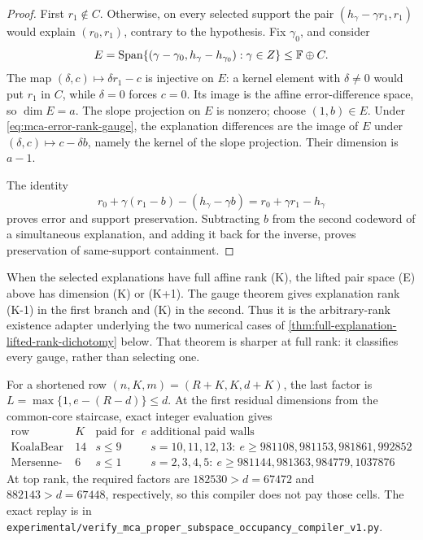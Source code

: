 \documentclass[11pt,a4paper]{amsart}
\numberwithin{equation}{section}
\theoremstyle{remark}
\newcommand{\F}{\mathbb F}\newcommand{\B}{\mathbb B}\newcommand{\K}{\mathbb K}\newcommand{\Z}{\mathbb Z}
\begin{document}
\begin{proof}
First \(r_1\notin C\).  Otherwise, on every selected support the pair
\((h_\gamma-\gamma r_1,r_1)\) would explain \((r_0,r_1)\), contrary
to the hypothesis.  Fix \(\gamma_0\), and consider
\[
 E=\Span\{(\gamma-\gamma_0,h_\gamma-h_{\gamma_0}):\gamma\in Z\}
 \le\F\oplus C.
\]
The map \((\delta,c)\mapsto\delta r_1-c\) is injective on \(E\): a
kernel element with \(\delta\ne0\) would put \(r_1\) in \(C\), while
\(\delta=0\) forces \(c=0\).  Its image is the affine error-difference
space, so \(\dim E=a\).  The slope projection on \(E\) is nonzero;
choose \((1,b)\in E\).  Under \eqref{eq:mca-error-rank-gauge}, the
explanation differences are the image of \(E\) under
\((\delta,c)\mapsto c-\delta b\), namely the kernel of the slope
projection.  Their dimension is \(a-1\).

The identity
\[
 r_0+\gamma(r_1-b)-(h_\gamma-\gamma b)
 =r_0+\gamma r_1-h_\gamma
\]
proves error and support preservation.  Subtracting \(b\) from the second
codeword of a simultaneous explanation, and adding it back for the inverse,
proves preservation of same-support containment.
\end{proof}

\begin{remark}
When the selected explanations have full affine rank (K), the lifted pair
space (E) above has dimension (K) or (K+1).  The gauge theorem gives
explanation rank (K-1) in the first branch and (K) in the second.  Thus it
is the arbitrary-rank existence adapter underlying the two numerical cases
of \cref{thm:full-explanation-lifted-rank-dichotomy} below.  That theorem is
sharper at full rank: it classifies every gauge, rather than selecting one.
\end{remark}

\begin{remark}
For a shortened row \((n,K,m)=(R+K,K,d+K)\), the last factor is
\(L=\max\{1,e-(R-d)\}\le d\).  At the first residual dimensions from the
common-core staircase, exact integer evaluation gives
\[
\begin{array}{c|c|c|c}
\text{row}&K&\text{paid for every }e&\text{additional paid walls}\\ \hline
\text{KoalaBear}&14&s\le9&
s=10,11,12,13:\ e\ge981108,981153,981861,992852\\
\text{Mersenne-31}&6&s\le1&
s=2,3,4,5:\ e\ge981144,981363,984779,1037876
\end{array}
\]
At top rank, the required factors are \(182530>d=67472\) and
\(882143>d=67448\), respectively, so this compiler does not pay those
cells.  The exact replay is in
\texttt{experimental/verify\_mca\_proper\_subspace\_occupancy\_compiler\_v1.py}.
\end{remark}
\end{document}
